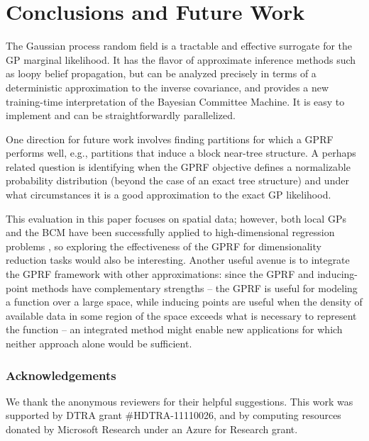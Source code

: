 \documentclass{article}
\begin{document}
 \vspace{-0.2cm}
\section{Conclusions and Future Work}
\vspace{-0.2cm}
The Gaussian process random field is a tractable and effective
surrogate for the GP marginal likelihood. It has the flavor of
approximate inference methods such as loopy belief propagation, but
can be analyzed precisely in terms of a deterministic approximation to
the inverse covariance, and provides a new training-time
interpretation of the Bayesian Committee Machine. It is easy to
implement and can be straightforwardly parallelized. 

One direction for future work involves finding partitions for
which a GPRF performs well, e.g., partitions that induce a block near-tree
structure. A perhaps related question is identifying when the GPRF
objective defines a normalizable probability
distribution (beyond the case of an exact tree structure) and under
what circumstances it is a good approximation to the exact GP likelihood.

This evaluation in this paper focuses on spatial data; however, both local
GPs and the BCM have been successfully applied to high-dimensional
regression problems \cite{chalupka2012, deisenroth2015distributed}, so
exploring the effectiveness of the GPRF for dimensionality reduction
tasks would also be interesting. Another useful avenue is to integrate the
GPRF framework with other approximations: since the GPRF and inducing-point methods have complementary strengths -- the GPRF is useful for
modeling a function over a large space, while inducing points are useful
when the density of available data in some region of the space
exceeds what is necessary to represent the function -- an integrated
method might enable new applications for which neither approach alone
would be sufficient. 

\vspace{-0.2cm}
\subsubsection*{Acknowledgements}
\vspace{-0.1cm}
We thank the anonymous reviewers for their helpful 
suggestions.  This work was supported by DTRA grant \#HDTRA-11110026,
and by computing resources donated by Microsoft Research under an Azure for Research grant.
\pagebreak

{\small }
\end{document}
